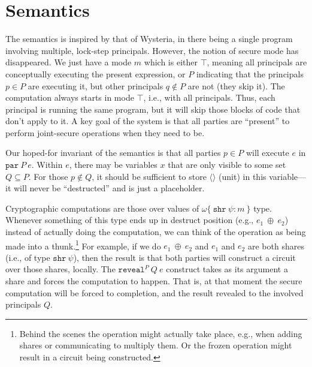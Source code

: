 \documentclass[10pt]{article}
\newcommand{\kw}[1]{\ensuremath{\mathtt{#1}}}
\newcommand{\sshare}[1]{\ensuremath{\mathtt{shr}~{#1}}}
\newcommand{\sectyp}[3]{\ensuremath{{#1} \{~{#2}:{#3}~\}}}
\newcommand{\ebinop}[2]{\ensuremath{{#1}~\oplus~{#2}}}
\newcommand{\epar}[2]{\ensuremath{\kw{par}~{#1}~{#2}}}
\newcommand{\ereveal}[3]{\ensuremath{\kw{reveal}^{#1}~{#2}~{#3}}}
\newcommand{\mwh}[1]{\textcolor{red}{Mike: #1}}
\begin{document}


\section{Semantics}

The semantics is inspired by that of Wysteria, in there being a single
program involving multiple, lock-step principals. However, the notion
of secure mode has disappeared. We just have a mode $m$ which is
either $\top$, meaning all principals are conceptually executing the
present expression, or $P$ indicating that the principals
$p \in P$ are executing it, but other principals $q \not\in P$ are not
(they skip it). The computation always starts in mode $\top$, i.e.,
with all principals. Thus, each principal is running the same program,
but it will skip those blocks of code that don't apply to it.  A key
goal of the system is that all parties are ``present'' to perform
joint-secure operations when they need to be.

Our hoped-for invariant of the semantics is that all parties $p \in P$
will execute $e$ in $\epar{P}{e}$. Within $e$, there may be variables
$x$ that are only visible to some set $Q \subseteq P$. For those
$p \not\in Q$, it should be sufficient to store $\langle \rangle$
(unit) in this variable---it will never be ``destructed'' and is just
a placeholder.

Cryptographic computations are those over values of
$\sectyp{\omega}{\sshare{\psi}}{m}$ type. Whenever something of this
type ends up in destruct position (e.g., $\ebinop{e_1}{e_2}$) instead
of actually doing the computation, we can think of the operation as
being made into a thunk.\footnote{Behind the scenes the operation
  might actually take place, e.g., when adding shares or communicating
  to multiply them. Or the frozen operation might result in a circuit
  being constructed.} For example, if we do $\ebinop{e_1}{e_2}$ and
$e_1$ and $e_2$ are both shares (i.e., of type $\sshare{\psi}$), then
the result is that both parties will construct a circuit over those
shares, locally. The $\ereveal{P}{Q}{e}$ construct takes as its argument
a share and forces the computation to happen. That is, at that moment
the secure computation will be forced to completion, and the result
revealed to the involved principals $Q$.
\end{document}
